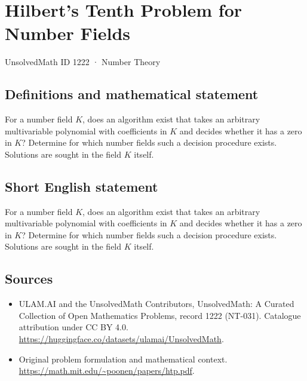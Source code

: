 \documentclass[11pt]{article}
\begin{document}
\setcounter{section}{1221}
\section{Hilbert's Tenth Problem for Number Fields}\label{1222}
{\small UnsolvedMath ID 1222 · Number Theory}
\subsection{Definitions and mathematical statement}
For a number field $K$, does an algorithm exist that takes an arbitrary multivariable polynomial with coefficients in $K$ and decides whether it has a zero in $K$? Determine for which number fields such a decision procedure exists. Solutions are sought in the field $K$ itself.
\subsection{Short English statement}
For a number field $K$, does an algorithm exist that takes an arbitrary multivariable polynomial with coefficients in $K$ and decides whether it has a zero in $K$? Determine for which number fields such a decision procedure exists. Solutions are sought in the field $K$ itself.
\subsection{Sources}
\begin{itemize}
\item[\hypertarget{source:1222:1}{S1}] ULAM.AI and the UnsolvedMath Contributors, UnsolvedMath: A Curated Collection of Open Mathematics Problems, record 1222 (NT-031). Catalogue attribution under CC BY 4.0.
\url{https://huggingface.co/datasets/ulamai/UnsolvedMath}.
\item[\hypertarget{source:1222:2}{S2}] Original problem formulation and mathematical context.
\url{https://math.mit.edu/~poonen/papers/htp.pdf}.
\end{itemize}
\label{end:1222}
\end{document}
